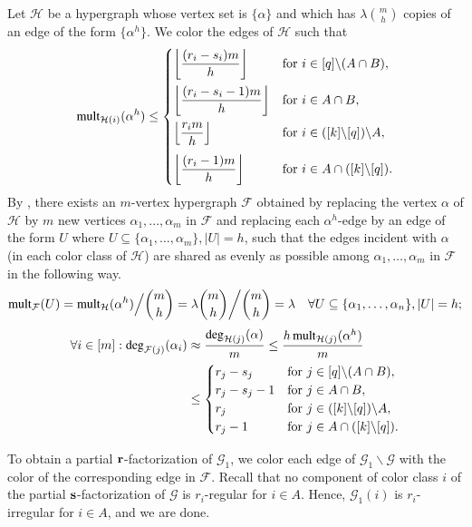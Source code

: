\documentclass[12pt,oneside]{amsart}
\newcommand\mult{\operatorname{\textup{{\fontfamily{ptm}\selectfont mult}}}}
\newcommand\dg{\operatorname{\textup{{\fontfamily{ptm}\selectfont deg}}}}
\newcommand{\cc}{\mathcal}
\newcommand\rounddown[1]{\left\lfloor#1\right\rfloor}
\begin{document}
Let $\cc H$ be a hypergraph whose vertex set is $\{\alpha\}$ and which has ${\lambda \binom{m}{h}}$ copies of an edge of the form $\{\alpha^h\}$. We color the edges of $\cc H$ such that
\begin{align*}
  \mult_{\cc H(i)}(\alpha^h)\leq
  \begin{cases}
    \rounddown{\dfrac{(r_i-s_i) m}{h}}
    &
    {\text{for}}\ i\in [q]\backslash (A\cap B),
    \\[10pt]
    \rounddown{\dfrac{(r_i-s_i-1) m}{h}}
    &
    {\text{for}}\ i\in A \cap B,
    \\[10pt]
    \rounddown{\dfrac{r_i m}{h}}
    &
    {\text{for}}\ i\in ([k]\backslash[q])\backslash A,
    \\[10pt]
    \rounddown{\dfrac{(r_i-1) m}{h}}
    &
    {\text{for}}\  i\in A\cap ([k]\backslash[q]).
  \end{cases}
\end{align*}
By \cite[Theorem 4.1]{MR2942724}, there exists an $m$-vertex hypergraph $\cc F$ obtained by replacing the vertex $\alpha$ of $\cc H$ by $m$ new vertices  $\alpha_1,\dots,\alpha_m$ in $\cc F$ and replacing each $\alpha^h$-edge by an edge of the form $U$ where $U\subseteq \{\alpha_1,\dots,\alpha_{m}\}, |U|=h$, such that the edges incident with $\alpha$ (in each color class of $\cc H$) are shared as evenly as possible among $\alpha_1,\dots,\alpha_m$ in $\cc F$ in the following way. 
\begin{align*}
        \mult_{\cc F}(U)&=\mult_{\cc H}(\alpha^h)\Big/\binom{m}{h}=\lambda\dbinom{m}{h}\bigg/\dbinom{m}{h}=\lambda  &\forall U\subseteq \{\alpha_1,\dots,\alpha_{n}\}, |U|=h;
\end{align*}
\begin{align*}
 \forall i\in [m]: \dg_{\cc F(j)}(\alpha_i)&\approx\dfrac{\dg_{\cc H(j)}(\alpha)}{m}\leq \dfrac{h \mult_{\cc H(j)}(\alpha^h)}{m} \\%
  &\leq \begin{cases}
    r_j-s_j
    &
    {\text{for}}\ j\in [q]\backslash (A\cap B),
    \\
    r_j-s_j-1
    &
    {\text{for}}\ j\in A \cap B,
    \\
    r_j
    &
    {\text{for}}\ j\in ([k]\backslash[q])\backslash A,
    \\
    r_j-1
    &
    {\text{for}}\  j\in A\cap ([k]\backslash[q]).
  \end{cases}
\end{align*}

To obtain a partial  $\vb r$-factorization of $\cc G_1$, we color each edge of $\cc G_1 \backslash \mathcal G$ with the color of the corresponding edge in $\cc F$. Recall that no component of color class $i$ of the  partial $\vb s$-factorization of $\cc G$ is $r_i$-regular for $i\in A$. Hence, $\cc G_1(i)$ is $r_i$-irregular for $i\in A$, and we are done. 
\end{document}
